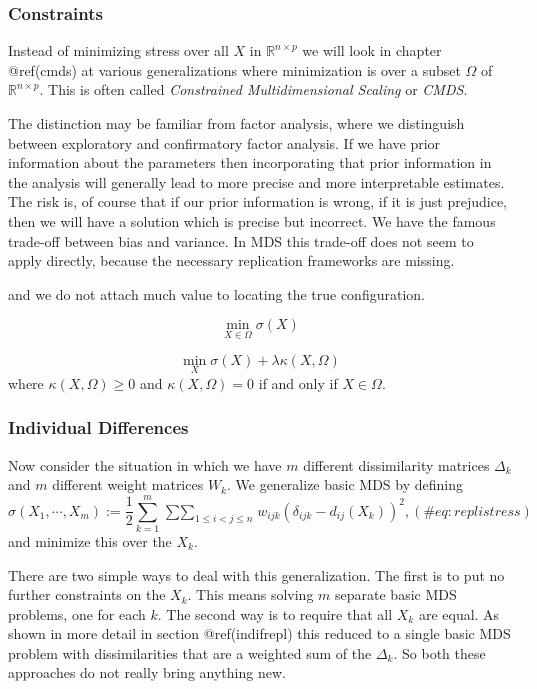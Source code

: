 \documentclass[
  12pt,
  letterpaper,
  DIV=11,
  numbers=noendperiod]{scrartcl}
\begin{document}
\subsubsection{Constraints}\label{gencons}

Instead of minimizing stress over all \(X\) in
\(\mathbb{R}^{n\times p}\) we will look in chapter @ref(cmds) at various
generalizations where minimization is over a subset \(\mathcal{\Omega}\)
of \(\mathbb{R}^{n\times p}\). This is often called \emph{Constrained
Multidimensional Scaling} or \emph{CMDS}.

The distinction may be familiar from factor analysis, where we
distinguish between exploratory and confirmatory factor analysis. If we
have prior information about the parameters then incorporating that
prior information in the analysis will generally lead to more precise
and more interpretable estimates. The risk is, of course that if our
prior information is wrong, if it is just prejudice, then we will have a
solution which is precise but incorrect. We have the famous trade-off
between bias and variance. In MDS this trade-off does not seem to apply
directly, because the necessary replication frameworks are missing.

and we do not attach much value to locating the true configuration.

\[
\min_{X\in\Omega}\sigma(X)
\]

\[
\min_X\sigma(X)+\lambda\kappa(X,\Omega)
\] where \(\kappa(X,\Omega)\geq 0\) and \(\kappa(X,\Omega)=0\) if and
only if \(X\in\Omega\).

\subsubsection{Individual Differences}\label{inreplic}

Now consider the situation in which we have \(m\) different
dissimilarity matrices \(\Delta_k\) and \(m\) different weight matrices
\(W_k\). We generalize basic MDS by defining \begin{equation}
\sigma(X_1,\cdots,X_m):=\frac12\sum_{k=1}^m\mathop{\sum\sum}_{1\leq i<j\leq n}w_{ijk}(\delta_{ijk}-d_{ij}(X_k))^2,
(\#eq:replistress)
\end{equation} and minimize this over the \(X_k\).

There are two simple ways to deal with this generalization. The first is
to put no further constraints on the \(X_k\). This means solving \(m\)
separate basic MDS problems, one for each \(k\). The second way is to
require that all \(X_k\) are equal. As shown in more detail in section
@ref(indifrepl) this reduced to a single basic MDS problem with
dissimilarities that are a weighted sum of the \(\Delta_k\). So both
these approaches do not really bring anything new.
\end{document}
